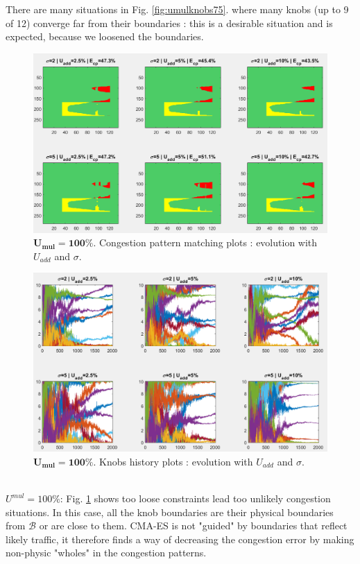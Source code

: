 There are many situations in Fig. \ref{fig:umulknobs75}. where many knobs (up to 9 of 12) converge far from their boundaries : this is a desirable situation and is expected, because we loosened the boundaries.\\
\begin{figure} 
	\label{fig:umulcp100}
	\caption{$\mathbf{U_{mul}=100\%}$. Congestion pattern matching plots : evolution with $U_{add}$ and $\sigma$.}
	\includegraphics[width=7in]{figures/results_figures/Umul/cp_Umul_100_lambda_11.png}
\end{figure}
\begin{figure}
	\label{fig:umulknobs100}
	\caption{$\mathbf{U_{mul}=100\%}$. Knobs history plots : evolution with $U_{add}$ and $\sigma$.}
	\includegraphics[width=7in]{figures/results_figures/Umul/knobs_Umul_100_lambda_11.png}
\end{figure}	
\\
\emph{$U^{mul}=100\% $}: Fig. \ref{fig:umulcp100} shows too loose constraints lead too unlikely congestion situations. In this case, all the knob boundaries are their physical boundaries from $\mathscr{B}$ or are close to them. CMA-ES is not "guided" by boundaries that reflect likely traffic, it therefore finds a way of decreasing the congestion error by making non-physic "wholes" in the congestion patterns.\\
